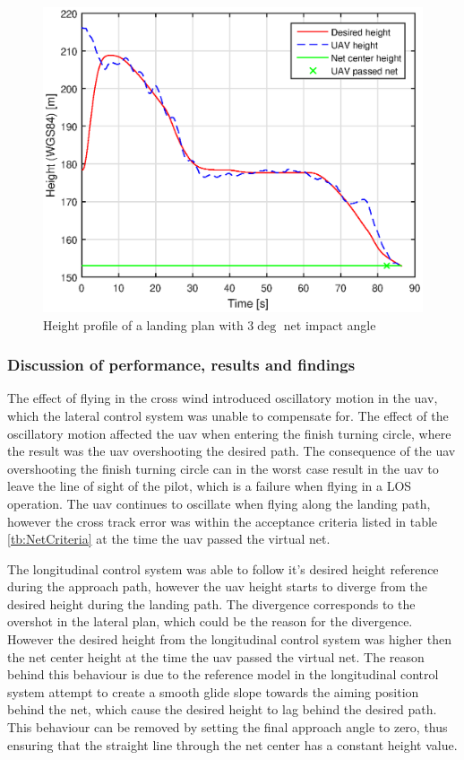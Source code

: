 \begin{figure}[H]
\centering
		\includegraphics[scale=0.7]{figs/Experiment/Height31mai103029.eps}
		\caption{Height profile of a landing plan with $3 \deg$ net impact angle}
		\label{Fig:Height31mai103029}
\end{figure}
\subsubsection{Discussion of performance, results and findings}
The effect of flying in the cross wind introduced oscillatory motion in the \gls{uav}, which the lateral control system was unable to compensate for. The effect of the oscillatory motion affected the \gls{uav} when entering the finish turning circle, where the result was the \gls{uav} overshooting the desired path. The consequence of the \gls{uav} overshooting the finish turning circle can in the worst case result in the \gls{uav} to leave the line of sight of the pilot, which is a failure when flying in a LOS operation. The \gls{uav} continues to oscillate when flying along the landing path, however the cross track error was within the acceptance criteria listed in table \ref{tb:NetCriteria} at the time the \gls{uav} passed the virtual net.

The longitudinal control system was able to follow it's desired height reference during the approach path, however the \gls{uav} height starts to diverge from the desired height during the landing path. The divergence corresponds to the overshot in the lateral plan, which could be the reason for the divergence. However the desired height from the longitudinal control system was higher then the net center height at the time the \gls{uav} passed the virtual net. The reason behind this behaviour is due to the reference model in the longitudinal control system attempt to create a smooth glide slope towards the aiming position behind the net, which cause the desired height to lag behind the desired path. This behaviour can be removed by setting the final approach angle to zero, thus ensuring that the straight line through the net center has a constant height value.
